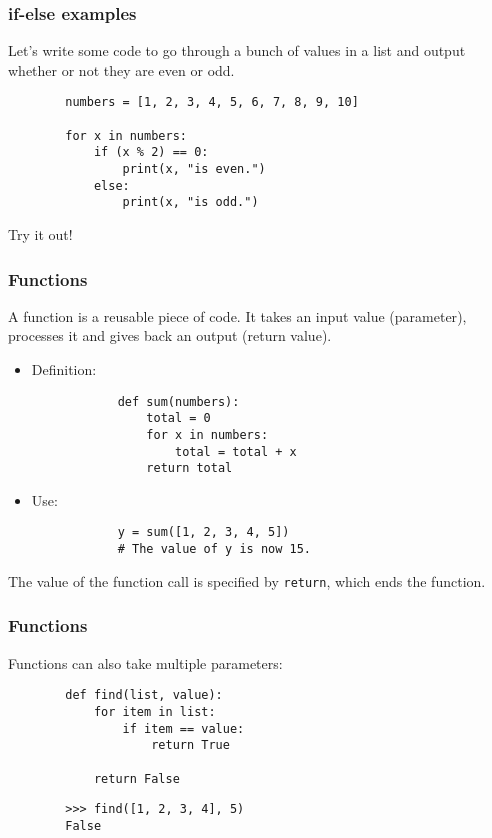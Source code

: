 \documentclass[notes]{beamer}
\begin{document}
	\begin{frame}[fragile]
		\frametitle{if-else examples}
		
		Let's write some code to go through a bunch of values in a list and output whether or not they are even or odd.
		
		\pause
		\begin{lstlisting}
		numbers = [1, 2, 3, 4, 5, 6, 7, 8, 9, 10]
		
		for x in numbers:
		    if (x % 2) == 0:
		        print(x, "is even.")
		    else:
		        print(x, "is odd.")
		\end{lstlisting}
		\pause
		Try it out!
	\end{frame}
	
	\begin{frame}[fragile]
		\frametitle{Functions}
		
		A function is a reusable piece of code. It takes an input value (\colorbox{jargonbg}{parameter}), processes it and gives back an output (\colorbox{jargonbg}{return value}). \pause
		
		\begin{itemize}
			\item Definition:
			\begin{lstlisting}
			def sum(numbers):
			    total = 0
			    for x in numbers:
			        total = total + x
			    return total
			\end{lstlisting}
			\pause
			
			\item Use:
			\begin{lstlisting}
			y = sum([1, 2, 3, 4, 5])
			# The value of y is now 15.
			\end{lstlisting}
		\end{itemize}
		
		The value of the function call is specified by \lstinline|return|, which ends the function.
	\end{frame}
	
	\begin{frame}[fragile]
		\frametitle{Functions}
		Functions can also take multiple parameters:
		\begin{lstlisting}
		def find(list, value):
		    for item in list:
		        if item == value:
		            return True
		
		    return False
		\end{lstlisting}
		\begin{lstlisting}
		>>> find([1, 2, 3, 4], 5)
		False
		\end{lstlisting}
	\end{frame}
	
\end{document}
